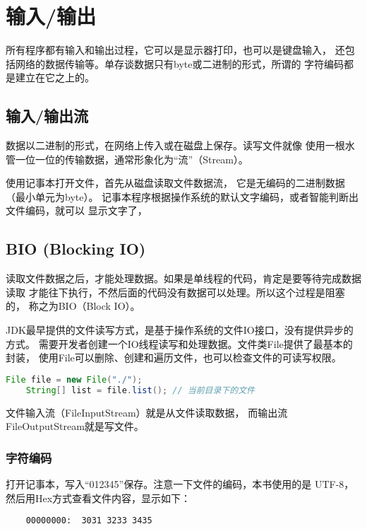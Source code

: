 \chapter{输入/输出}
\label{chap:java_io}

所有程序都有输入和输出过程，它可以是显示器打印，也可以是键盘输入，
还包括网络的数据传输等。单存谈数据只有byte或二进制的形式，所谓的
字符编码都是建立在它之上的。


\section{输入/输出流}
数据以二进制的形式，在网络上传入或在磁盘上保存。读写文件就像
使用一根水管一位一位的传输数据，通常形象化为“流”（Stream）。
\vspace{0.3cm}

\noindent

使用记事本打开文件，首先从磁盘读取文件数据流，
它是无编码的二进制数据（最小单元为byte）。
记事本程序根据操作系统的默认文字编码，或者智能判断出文件编码，就可以
显示文字了，

\section{BIO (Blocking IO)}
读取文件数据之后，才能处理数据。如果是单线程的代码，肯定是要等待完成数据读取
才能往下执行，不然后面的代码没有数据可以处理。所以这个过程是阻塞的，
称之为BIO（Block IO）。

JDK最早提供的文件读写方式，是基于操作系统的文件IO接口，没有提供异步的方式。
需要开发者创建一个IO线程读写和处理数据。文件类File提供了最基本的封装，
使用File可以删除、创建和遍历文件，也可以检查文件的可读写权限。

\begin{lstlisting}[language=Java]
	File file = new File("./");
	String[] list = file.list(); // 当前目录下的文件
\end{lstlisting}

\noindent
文件输入流（FileInputStream）就是从文件读取数据，
而输出流FileOutputStream就是写文件。

\subsection{字符编码}
打开记事本，写入“012345”保存。注意一下文件的编码，本书使用的是
UTF-8，然后用Hex方式查看文件内容，显示如下：
\begin{lstlisting}
	00000000:  3031 3233 3435  
\end{lstlisting}

